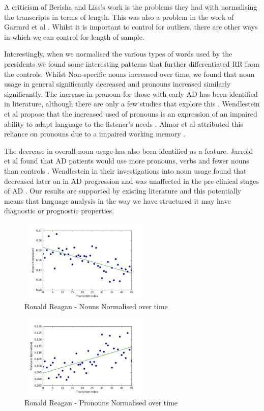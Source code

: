 \documentclass[10pt]{article}
\begin{document}
\twocolumn
A criticism of Berisha and Liss's work is the problems they had with normalising the transcripts in terms of length. This was also a problem in the work of Garrard et al \cite{Garrard2005, Le2011}. Whilst it is important to control for outliers, there are other ways in which we can control for length of sample.  
\par 
Interestingly, when we normalised the various types of words used by the presidents we found some interesting patterns that further differentiated RR from the controls. Whilst Non-specific nouns increased over time, we found that noun usage in general significantly decreased and pronouns increased similarly significantly. The increase in pronoun for those with early AD has been identified in literature, although there are only a few studies that explore this \cite{Almor1999, Wendelstein2015}. Wendlestein et al propose that the increased used of pronouns is an expression of an impaired ability to adapt language to the listener's needs \cite{Wendelstein2015}. Almor et al attributed this reliance on pronouns due to a impaired working memory \cite{Almor1999}.
\par 
The decrease in overall noun usage has also been identified as a feature. Jarrold et al found that AD patients would use more pronouns, verbs and fewer nouns than controls \cite{Jarrold2014}. Wendlestein in their investigations into noun usage found that decreased later on in AD progression and was unaffected in the pre-clinical stages of AD \cite{Wendelstein2014}. Our results are supported by existing literature and this potentially means that language analysis in the way we have structured it may have diagnostic or prognostic properties.

\begin{figure}[H]
	\centering
	\includegraphics[width=240px, height=150px]{images/RRNounsNormalised.png}
	\caption{Ronald Reagan - Nouns Normalised over time}
\end{figure}

\begin{figure}[H]
	\centering
	\includegraphics[width=240px, height=150px]{images/RRPronouns.png}
	\caption{Ronald Reagan - Pronouns Normalised over time}
\end{figure}
 
\end{document}
